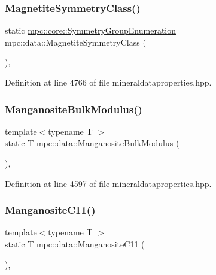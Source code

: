 \subsubsection{\texorpdfstring{Magnetite\+Symmetry\+Class()}{MagnetiteSymmetryClass()}}
{\footnotesize\ttfamily static \mbox{\hyperlink{namespacempc_1_1core_a9d979684062547055a0ef5c13077bad8}{mpc\+::core\+::\+Symmetry\+Group\+Enumeration}} mpc\+::data\+::\+Magnetite\+Symmetry\+Class (\begin{DoxyParamCaption}{ }\end{DoxyParamCaption})\hspace{0.3cm}{\ttfamily [inline]}, {\ttfamily [static]}}



Definition at line 4766 of file mineraldataproperties.\+hpp.

\mbox{\label{namespacempc_1_1data_a409ed4889b8f38083b3ed28ca912de43}} 
\subsubsection{\texorpdfstring{Manganosite\+Bulk\+Modulus()}{ManganositeBulkModulus()}}
{\footnotesize\ttfamily template$<$typename T $>$ \\
static T mpc\+::data\+::\+Manganosite\+Bulk\+Modulus (\begin{DoxyParamCaption}{ }\end{DoxyParamCaption})\hspace{0.3cm}{\ttfamily [inline]}, {\ttfamily [static]}}



Definition at line 4597 of file mineraldataproperties.\+hpp.

\mbox{\label{namespacempc_1_1data_ad3c36944afa8780864e2135ef6d1a44f}} 
\subsubsection{\texorpdfstring{Manganosite\+C11()}{ManganositeC11()}}
{\footnotesize\ttfamily template$<$typename T $>$ \\
static T mpc\+::data\+::\+Manganosite\+C11 (\begin{DoxyParamCaption}{ }\end{DoxyParamCaption})\hspace{0.3cm}{\ttfamily [inline]}, {\ttfamily [static]}}



